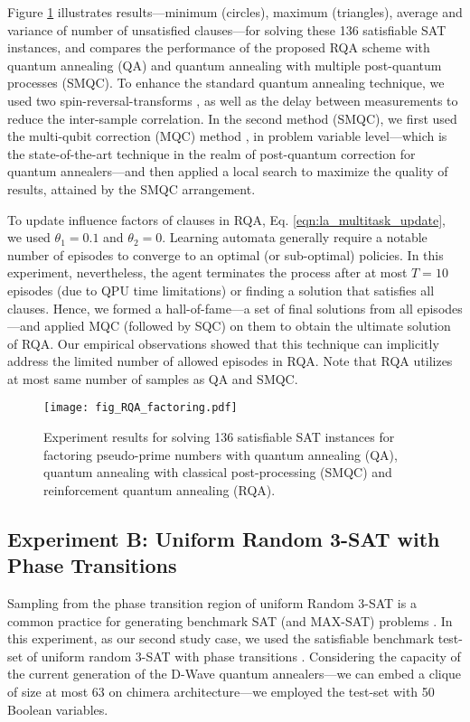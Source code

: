 \documentclass[fleqn,10pt]{wlscirep}
\begin{document}
Figure \ref{fig:RQA_factoring} illustrates results—minimum (circles), maximum (triangles), average and variance of number of unsatisfied clauses—for solving these 136 satisfiable SAT instances, and compares the performance of the proposed RQA scheme with quantum annealing (QA) and quantum annealing with multiple post-quantum processes (SMQC). To enhance the standard quantum annealing technique, we used two spin-reversal-transforms \cite{pelofske2019optimizing}, as well as the delay between measurements to reduce the inter-sample correlation.
In the second method (SMQC), we first used the multi-qubit correction (MQC) method \cite{dorband2018method}, in problem variable level—which is the state-of-the-art technique in the realm of post-quantum correction for quantum annealers—and then applied a local search to maximize the quality of results, attained by the SMQC arrangement. 

To update influence factors of clauses in RQA, Eq. \eqref{eqn:la_multitask_update}, we used $\theta_1 =0.1$ and $\theta_2 =0$. Learning automata generally require a notable number of episodes to converge to an optimal (or sub-optimal) policies. In this experiment, nevertheless, the agent terminates the process after at most $T=10$ episodes (due to QPU time limitations) or finding a solution that satisfies all clauses. Hence, we formed a hall-of-fame—a set of final solutions from all episodes—and applied MQC (followed by SQC) on them to obtain the ultimate solution of RQA. Our empirical observations showed that this technique can implicitly address the limited number of allowed episodes in RQA. Note that RQA utilizes at most same number of samples as QA and SMQC.

\begin{figure}
	\centering
	\texttt{[image: fig\_RQA\_factoring.pdf]}
	\caption{
Experiment results for solving 136 satisfiable SAT instances for factoring pseudo-prime numbers with quantum annealing (QA), quantum annealing with classical post-processing (SMQC) and reinforcement quantum annealing (RQA).
	}
	\label{fig:RQA_factoring}
\end{figure}

\subsection*{Experiment B: Uniform Random 3-SAT with Phase Transitions}
Sampling from the phase transition region of uniform Random 3-SAT is a common practice for generating benchmark SAT (and MAX-SAT) problems \cite{cheeseman1991really,selman1996generating,achlioptas2000generating,nudelman2004understanding}. In this experiment, as our second study case, we used the satisfiable benchmark test-set of uniform random 3-SAT with phase transitions \cite{hoos2000satlib}. Considering the capacity of the current generation of the D-Wave quantum annealers—we can embed a clique of size at most 63 on chimera architecture—we employed the test-set with 50 Boolean variables.
\end{document}
